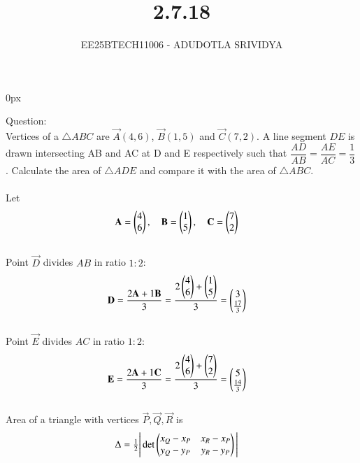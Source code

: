 \documentclass[journal]{IEEEtran}
\begin{document}

\title{2.7.18}
\author{EE25BTECH11006 - ADUDOTLA SRIVIDYA }
{\let\newpage\relax\maketitle}
\renewcommand{\thefigure}{\theenumi}
\renewcommand{\thetable}{\theenumi}
\setlength{\intextsep}{10pt}
\renewcommand{\thetable}{\theenumi}
\parindent 0px

Question:\\
Vertices of a $\triangle ABC$ are $\vec{A}(4,6)$, $\vec{B}(1,5)$ and $\vec{C}(7,2)$.  
A line segment $DE$ is drawn intersecting AB and AC at D and E respectively such that  
$\dfrac{AD}{AB} = \dfrac{AE}{AC} = \dfrac{1}{3}$.  
Calculate the area of $\triangle ADE$ and compare it with the area of $\triangle ABC$.\\

\solution\\
Let
\begin{align*}
    \mathbf{A} &= \begin{pmatrix}4\\6\end{pmatrix}, \quad
    \mathbf{B} = \begin{pmatrix}1\\5\end{pmatrix}, \quad
    \mathbf{C} = \begin{pmatrix}7\\2\end{pmatrix}
\end{align*} \\

Point $\vec{D}$ divides $AB$ in ratio $1:2$:
\begin{align*}
    \mathbf{D} &= \frac{2\mathbf{A} + 1\mathbf{B}}{3} 
             = \frac{2\begin{pmatrix}4\\6\end{pmatrix} + \begin{pmatrix}1\\5\end{pmatrix}}{3} 
             = \begin{pmatrix}3\\\tfrac{17}{3}\end{pmatrix}
\end{align*} \\

Point $\vec{E}$ divides $AC$ in ratio $1:2$:
\begin{align*}
    \mathbf{E} &= \frac{2\mathbf{A} + 1\mathbf{C}}{3} 
             = \frac{2\begin{pmatrix}4\\6\end{pmatrix} + \begin{pmatrix}7\\2\end{pmatrix}}{3} 
             = \begin{pmatrix}5\\\tfrac{14}{3}\end{pmatrix}
\end{align*} \\

Area of a triangle with vertices $\vec{P}, \vec{Q}, \vec{R}$ is
\begin{align*}
    \Delta &= \tfrac{1}{2}\Bigg|\det \begin{pmatrix}x_Q - x_P & x_R - x_P \\ y_Q - y_P & y_R - y_P\end{pmatrix}\Bigg|
\end{align*} \\
\end{document}
